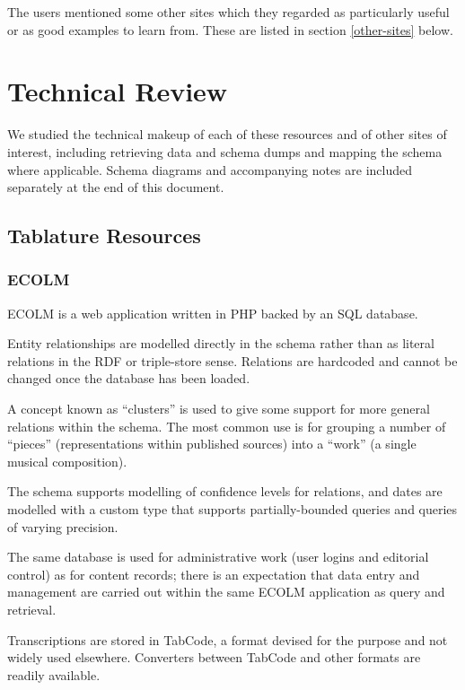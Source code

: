 \documentclass[sigconf, nonacm=true]{acmart}
\begin{document}
\begin{sloppypar}
  The users mentioned some other sites which they regarded as
  particularly useful or as good examples to learn from. These are
  listed in section \ref{other-sites} below.
  
  \section{Technical Review}\label{technical}

  We studied the technical makeup of each of these resources and of
  other sites of interest, including retrieving data and schema dumps
  and mapping the schema where applicable. Schema diagrams and
  accompanying notes are included separately at the end of this
  document.
  
  \subsection{Tablature Resources}
  
  \subsubsection{ECOLM}

  ECOLM is a web application written in PHP backed by an SQL
  database.

  Entity relationships are modelled directly in the schema rather than
  as literal relations in the RDF or triple-store sense. Relations are
  hardcoded and cannot be changed once the database has been loaded.
  
  A concept known as ``clusters'' is used to give some support for
  more general relations within the schema. The most common use is for
  grouping a number of ``pieces'' (representations within published
  sources) into a ``work'' (a single musical composition).

  The schema supports modelling of confidence levels for relations,
  and dates are modelled with a custom type that supports
  partially-bounded queries and queries of varying precision.
  
  The same database is used for administrative work (user logins and
  editorial control) as for content records; there is an expectation
  that data entry and management are carried out within the same ECOLM
  application as query and retrieval.

  Transcriptions are stored in TabCode, a format devised for the
  purpose and not widely used elsewhere. Converters between TabCode
  and other formats are readily available.
 

\end{sloppypar}
\end{document}
